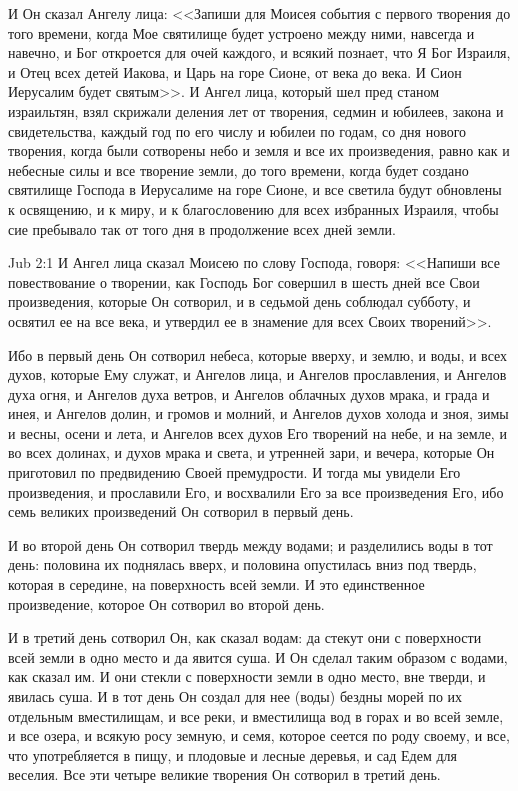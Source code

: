 И Он сказал Ангелу лица: <<Запиши для Моисея события с первого
творения до того времени, когда Мое святилище будет устроено между ними,
навсегда и навечно, и Бог откроется для очей каждого, и всякий познает, что Я
Бог Израиля, и Отец всех детей Иакова, и Царь на горе Сионе, от века до века. И
Сион Иерусалим будет святым>>. И Ангел лица, который шел пред станом
израильтян, взял скрижали деления лет от творения, седмин и юбилеев, закона и
свидетельства, каждый год по его числу и юбилеи по годам, со дня нового
творения, когда были сотворены небо и земля и все их произведения, равно как и
небесные силы и все творение земли, до того времени, когда будет создано
святилище Господа в Иерусалиме на горе Сионе, и все светила будут обновлены к
освящению, и к миру, и к благословению для всех избранных Израиля, чтобы сие
пребывало так от того дня в продолжение всех дней земли.

\vs Jub 2:1
И Ангел лица сказал Моисею по слову Господа, говоря: <<Напиши все
повествование о творении, как Господь Бог совершил в шесть дней все Свои
произведения, которые Он сотворил, и в седьмой день соблюдал субботу, и освятил
ее на все века, и утвердил ее в знамение для всех Своих творений>>.

Ибо в первый день Он сотворил небеса, которые вверху, и землю, и воды, и
всех духов, которые Ему служат, и Ангелов лица, и Ангелов прославления, и
Ангелов духа огня, и Ангелов духа ветров, и Ангелов облачных духов мрака, и
града и инея, и Ангелов долин, и громов и молний, и Ангелов духов холода и
зноя, зимы и весны, осени и лета, и Ангелов всех духов Его творений на небе, и
на земле, и во всех долинах, и духов мрака и света, и утренней зари, и вечера,
которые Он приготовил по предвидению Своей премудрости. И тогда мы увидели Его
произведения, и прославили Его, и восхвалили Его за все произведения Его, ибо
семь великих произведений Он сотворил в первый день.

И во второй день Он сотворил твердь между водами; и разделились воды в тот
день: половина их поднялась вверх, и половина опустилась вниз под твердь,
которая в середине, на поверхность всей земли. И это единственное произведение,
которое Он сотворил во второй день.

И в третий день сотворил Он, как сказал водам: да стекут они с поверхности
всей земли в одно место и да явится суша. И Он сделал таким образом с водами,
как сказал им. И они стекли с поверхности земли в одно место, вне тверди, и
явилась суша. И в тот день Он создал для нее (воды) бездны морей по их
отдельным вместилищам, и все реки, и вместилища вод в горах и во всей земле, и
все озера, и всякую росу земную, и семя, которое сеется по роду своему, и все,
что употребляется в пищу, и плодовые и лесные деревья, и сад Едем для веселия.
Все эти четыре великие творения Он сотворил в третий день.


